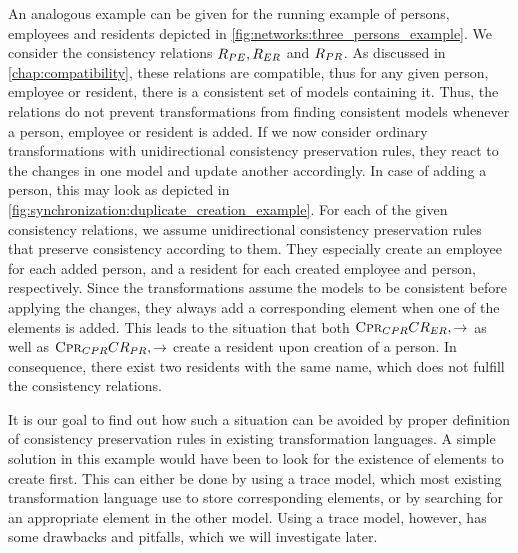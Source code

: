 An analogous example can be given for the running example of persons, employees and residents depicted in \autoref{fig:networks:three_persons_example}.
We consider the consistency relations $R_{PE}, R_{ER}$ and $R_{PR}$.
As discussed in \autoref{chap:compatibility}, these relations are compatible, thus for any given person, employee or resident, there is a consistent set of models containing it.
Thus, the relations do not prevent transformations from finding consistent models whenever a person, employee or resident is added.
If we now consider ordinary transformations with unidirectional consistency preservation rules, they react to the changes in one model and update another accordingly.
In case of adding a person, this may look as depicted in \autoref{fig:synchronization:duplicate_creation_example}.
For each of the given consistency relations, we assume unidirectional consistency preservation rules that preserve consistency according to them.
They especially create an employee for each added person, and a resident for each created employee and person, respectively.
Since the transformations assume the models to be consistent before applying the changes, they always add a corresponding element when one of the elements is added.
This leads to the situation that both $\textsc{Cpr}_{CPR}{CR_{ER},\rightarrow}$ as well as $\textsc{Cpr}_{CPR}{CR_{PR},\rightarrow}$ create a resident upon creation of a person.
In consequence, there exist two residents with the same name, which does not fulfill the consistency relations.

It is our goal to find out how such a situation can be avoided by proper definition of consistency preservation rules in existing transformation languages.
A simple solution in this example would have been to look for the existence of elements to create first.
This can either be done by using a trace model, which most existing transformation language use to store corresponding elements, or by searching for an appropriate element in the other model.
Using a trace model, however, has some drawbacks and pitfalls, which we will investigate later.




